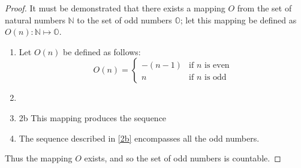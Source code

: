 \begin{proof}
	It must be demonstrated that there exists a mapping $ O $ from the set of natural numbers $\mathbb{N}$ to the set of odd numbers $ \mathbb{O} $; let this mapping be defined as $ O(n) : \mathbb{N} \mapsto \mathbb{O} $.
	\begin{enumerate}[label=\textbf{\Roman*}]
		\item Let $ O(n) $ be defined as follows: \[ O(n) = \begin{cases} -(n-1) & \text{if } n \text{ is even} \\ n & \text{if } n \text{ is odd} \end{cases} \]
		\item \item{2b} This mapping produces the sequence 
		\item The sequence described in \ref{2b} encompasses all the odd numbers.
	\end{enumerate}
	Thus the mapping $ O $ exists, and so the set of odd numbers is countable.
\end{proof}